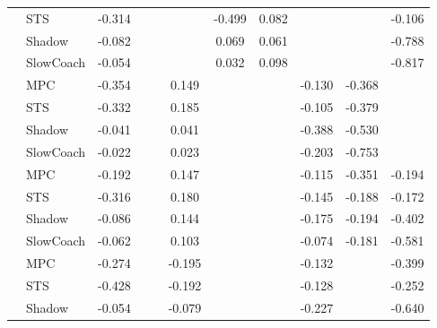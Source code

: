 \begin{tabular}{|l|l|*{9}{c|}}
                                                           & STS &   -0.314 &        &        &     & -0.499 &  0.082 &      &      &   -0.106 \\
                                                           & Shadow &   -0.082 &        &        &     &  0.069 &  0.061 &      &      &   -0.788 \\
                                                           & SlowCoach &   -0.054 &        &        &     &  0.032 &  0.098 &      &      &   -0.817 \\
\midrule
[True, False, False, True, False, False, True, True, False] & MPC &   -0.354 &        &        &  0.149 &     &     &  -0.130 &  -0.368 &       \\
                                                           & STS &   -0.332 &        &        &  0.185 &     &     &  -0.105 &  -0.379 &       \\
                                                           & Shadow &   -0.041 &        &        &  0.041 &     &     &  -0.388 &  -0.530 &       \\
                                                           & SlowCoach &   -0.022 &        &        &  0.023 &     &     &  -0.203 &  -0.753 &       \\
\midrule
[True, False, False, True, False, False, True, True, True] & MPC &   -0.192 &        &        &  0.147 &     &     &  -0.115 &  -0.351 &   -0.194 \\
                                                           & STS &   -0.316 &        &        &  0.180 &     &     &  -0.145 &  -0.188 &   -0.172 \\
                                                           & Shadow &   -0.086 &        &        &  0.144 &     &     &  -0.175 &  -0.194 &   -0.402 \\
                                                           & SlowCoach &   -0.062 &        &        &  0.103 &     &     &  -0.074 &  -0.181 &   -0.581 \\
\midrule
[True, False, False, True, False, False, True, False, True] & MPC &   -0.274 &        &        & -0.195 &     &     &  -0.132 &      &   -0.399 \\
                                                           & STS &   -0.428 &        &        & -0.192 &     &     &  -0.128 &      &   -0.252 \\
                                                           & Shadow &   -0.054 &        &        & -0.079 &     &     &  -0.227 &      &   -0.640 \\

\end{tabular}
